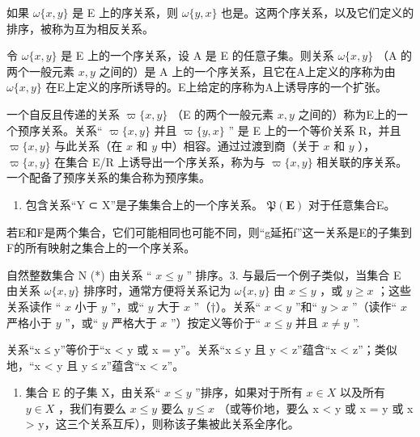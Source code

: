 如果 \(\omega\{x,y\}\) 是 E 上的序关系，则 \(\omega\{y,x\}\) 也是。这两个序关系，以及它们定义的排序，被称为互为相反关系。

令 \(\omega\{x, y\}\) 是 E 上的一个序关系，设 A 是 E 的任意子集。则关系 \(\omega\{x, y\}\) （A 的两个一般元素 \(x, y\) 之间的）是 A 上的一个序关系，且它在A上定义的序称为由 \(\omega\{x, y\}\) 在E上定义的序所诱导的。E上给定的序称为A上诱导序的一个扩张。

一个自反且传递的关系 \(\varpi\{x, y\}\) （E 的两个一般元素 \(x, y\) 之间的）称为E上的一个预序关系。关系“ \(\varpi\{x, y\}\) 并且 \(\varpi\{y, x\}\) '' 是 E 上的一个等价关系 R，并且 \(\varpi\{x, y\}\) 与此关系（在 \(x\) 和 \(y\) 中）相容。通过过渡到商（关于 \(x\) 和 \(y\) ）， \(\varpi\{x, y\}\) 在集合 E/R 上诱导出一个序关系，称为与 \(\varpi\{x, y\}\) 相关联的序关系。一个配备了预序关系的集合称为预序集。

\begin{enumerate}
\def\labelenumi{\arabic{enumi}.}
\setcounter{enumi}{1}
\tightlist
\item
  包含关系“Y ⊂ X”是子集集合上的一个序关系。 \(\mathfrak{P}(\mathbf{E})\) 对于任意集合E。
\end{enumerate}

若E和F是两个集合，它们可能相同也可能不同，则“g延拓f”这一关系是E的子集到F的所有映射之集合上的一个序关系。

自然整数集合 N (*) 由关系 `` \(x \leqslant y\) '' 排序。3. 与最后一个例子类似，当集合 E 由关系 \(\omega\{x, y\}\) 排序时，通常方便将关系记为 \(\omega\{x, y\}\) 由 \(x \leqslant y\) ，或 \(y \geqslant x\) ；这些关系读作 `` \(x\) 小于 \(y\) ''，或`` \(y\) 大于 \(x\) ''（†）。关系`` \(x < y\) ”和“ \(y > x\) ''（读作`` \(x\) 严格小于 \(y\) ''，或`` \(y\) 严格大于 \(x\) ''）按定义等价于`` \(x \leqslant y\) 并且 \(x \neq y\) ''.

关系``x ≤ y''等价于``x \textless{} y 或 x = y''。关系``x ≤ y 且 y \textless{} z''蕴含``x \textless{} z''；类似地，``x \textless{} y 且 y ≤ z''蕴含``x \textless{} z''。

\begin{enumerate}
\def\labelenumi{\arabic{enumi}.}
\setcounter{enumi}{3}
\tightlist
\item
  集合 E 的子集 X，由关系`` \(x \leqslant y\) ''排序，如果对于所有 \(x \in X\) 以及所有 \(y \in X\) ，我们有要么 \(x \leqslant y\) 要么 \(y \leqslant x\) （或等价地，要么 x \textless{} y 或 x = y 或 x \textgreater{} y，这三个关系互斥），则称该子集被此关系全序化。
\end{enumerate}

